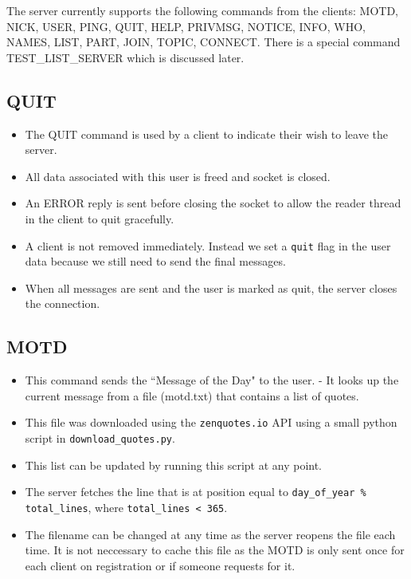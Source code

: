 \documentclass[letterpaper,twocolumn,10pt]{article}
\begin{document}
The server currently supports the following commands from the clients: MOTD,
NICK, USER, PING, QUIT, HELP, PRIVMSG, NOTICE, INFO, WHO, NAMES, LIST, PART,
JOIN, TOPIC, CONNECT. There is a special command TEST\_LIST\_SERVER which is
discussed later.

\subsection{QUIT}

\begin{itemize}

	\item The QUIT command is used by a client to indicate their wish to leave
	      the server.
	\item All data associated with this user is freed and socket is closed.
	\item An ERROR reply is sent before closing the socket to allow the reader
	      thread in the client to quit gracefully.
	\item A client is not removed immediately. Instead we set a \verb|quit|
	      flag in the user data because we still need to send the final messages.

	\item When all messages are sent and the user is marked as quit, the server
	      closes the connection.

\end{itemize}

\subsection{MOTD}

\begin{itemize}

	\item This command sends the ``Message of the Day" to the user. - It looks
	      up the current message from a file (motd.txt) that contains a list of
	      quotes.
	\item This file was downloaded using the \verb|zenquotes.io| API using a
	      small python script in \verb|download_quotes.py|.
	\item This list can be updated by running this script at any point.
	\item The server fetches the line that is at position equal to
	      \verb|day_of_year % total_lines|, where \verb|total_lines < 365|.
	\item The filename can be changed at any time as the server reopens the
	      file each time. It is not neccessary to cache this file as the MOTD is
	      only sent once for each client on registration or if someone requests
	      for it.

\end{itemize}
\end{document}
